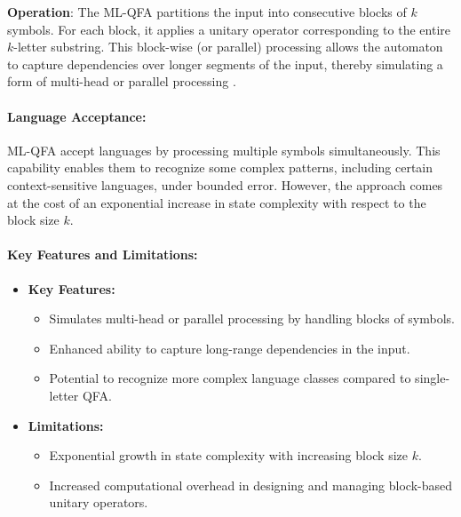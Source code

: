 \textbf{Operation}:  
The ML-QFA partitions the input into consecutive blocks of \( k \) symbols. For each block, it applies a unitary operator corresponding to the entire \( k \)-letter substring. This block-wise (or parallel) processing allows the automaton to capture dependencies over longer segments of the input, thereby simulating a form of multi-head or parallel processing \cite{belovs2007multi}.

\paragraph{Language Acceptance:}  
ML-QFA accept languages by processing multiple symbols simultaneously. This capability enables them to recognize some complex patterns, including certain context-sensitive languages, under bounded error. However, the approach comes at the cost of an exponential increase in state complexity with respect to the block size \( k \).

\paragraph{Key Features and Limitations:}
\begin{itemize}
    \item \textbf{Key Features:}
    \begin{itemize}
        \item Simulates multi-head or parallel processing by handling blocks of symbols.
        \item Enhanced ability to capture long-range dependencies in the input.
        \item Potential to recognize more complex language classes compared to single-letter QFA.
    \end{itemize}
    \item \textbf{Limitations:}
    \begin{itemize}
        \item Exponential growth in state complexity with increasing block size \( k \).
        \item Increased computational overhead in designing and managing block-based unitary operators.
    \end{itemize}
\end{itemize}

